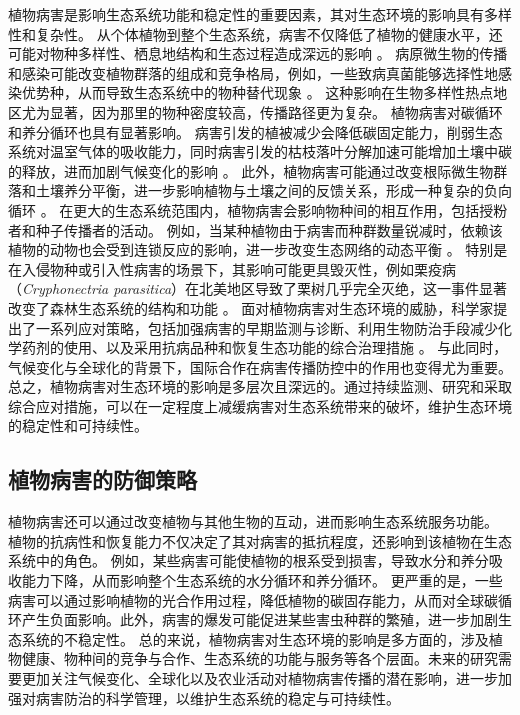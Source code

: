 \documentclass[AutoFakeBold]{LZUThesis-PgD&PhD}
\begin{document}
	植物病害是影响生态系统功能和稳定性的重要因素，其对生态环境的影响具有多样性和复杂性。
	从个体植物到整个生态系统，病害不仅降低了植物的健康水平，还可能对物种多样性、栖息地结构和生态过程造成深远的影响 \cite{Mitchell2002}。
	病原微生物的传播和感染可能改变植物群落的组成和竞争格局，例如，一些致病真菌能够选择性地感染优势种，从而导致生态系统中的物种替代现象 \cite{Garrett2006}。
	这种影响在生物多样性热点地区尤为显著，因为那里的物种密度较高，传播路径更为复杂。
	植物病害对碳循环和养分循环也具有显著影响。
	病害引发的植被减少会降低碳固定能力，削弱生态系统对温室气体的吸收能力，同时病害引发的枯枝落叶分解加速可能增加土壤中碳的释放，进而加剧气候变化的影响 \cite{Allison2008}。
	此外，植物病害可能通过改变根际微生物群落和土壤养分平衡，进一步影响植物与土壤之间的反馈关系，形成一种复杂的负向循环 \cite{Bever2010}。
	在更大的生态系统范围内，植物病害会影响物种间的相互作用，包括授粉者和种子传播者的活动。
	例如，当某种植物由于病害而种群数量锐减时，依赖该植物的动物也会受到连锁反应的影响，进一步改变生态网络的动态平衡 \cite{Maron2011}。
	特别是在入侵物种或引入性病害的场景下，其影响可能更具毁灭性，例如栗疫病（\textit{Cryphonectria parasitica}）在北美地区导致了栗树几乎完全灭绝，这一事件显著改变了森林生态系统的结构和功能 \cite{Anagnostakis1987}。
	面对植物病害对生态环境的威胁，科学家提出了一系列应对策略，包括加强病害的早期监测与诊断、利用生物防治手段减少化学药剂的使用、以及采用抗病品种和恢复生态功能的综合治理措施 \cite{Pautasso2010}。
	与此同时，气候变化与全球化的背景下，国际合作在病害传播防控中的作用也变得尤为重要。
	总之，植物病害对生态环境的影响是多层次且深远的。通过持续监测、研究和采取综合应对措施，可以在一定程度上减缓病害对生态系统带来的破坏，维护生态环境的稳定性和可持续性。
	
	
	
	\subsection{植物病害的防御策略}
	
	植物病害还可以通过改变植物与其他生物的互动，进而影响生态系统服务功能。
	植物的抗病性和恢复能力不仅决定了其对病害的抵抗程度，还影响到该植物在生态系统中的角色。
	例如，某些病害可能使植物的根系受到损害，导致水分和养分吸收能力下降，从而影响整个生态系统的水分循环和养分循环\cite{Schultz2010}。
	更严重的是，一些病害可以通过影响植物的光合作用过程，降低植物的碳固存能力，从而对全球碳循环产生负面影响\cite{Barton2011}。此外，病害的爆发可能促进某些害虫种群的繁殖，进一步加剧生态系统的不稳定性。
	总的来说，植物病害对生态环境的影响是多方面的，涉及植物健康、物种间的竞争与合作、生态系统的功能与服务等各个层面。未来的研究需要更加关注气候变化、全球化以及农业活动对植物病害传播的潜在影响，进一步加强对病害防治的科学管理，以维护生态系统的稳定与可持续性。
\end{document}
